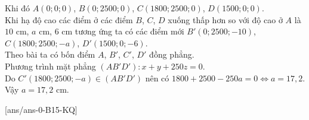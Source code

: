 \begin{ex}
{\begin{center}
	\end{center}
	Khi đó $A(0;0;0)$, $B(0;2500;0)$, $C(1800;2500;0)$, $D(1500;0;0)$.\\
	Khi hạ độ cao các điểm ở các điểm $B$, $C$, $D$ xuống thấp hơn so với độ cao ở $A$ là $10$ cm, $a$ cm, $6$ cm tương ứng ta có các điểm mới $B'(0;2500;-10)$, $C(1800;2500;-a)$, $D'(1500;0;-6)$.\\
	Theo bài ta có bốn điểm $A$, $B'$, $C'$, $D'$ đồng phẳng.\\
	Phương trình mặt phẳng $(AB'D') \colon x+y+250z=0$.\\
	Do $C'(1800;2500;-a) \in (AB'D')$ nên có $1800+2500-250a=0 \Leftrightarrow a=17{,}2$.\\
	Vậy $a=17{,}2$ cm.
	}
\end{ex}
[ans/ans-0-B15-KQ]
\TNSA
